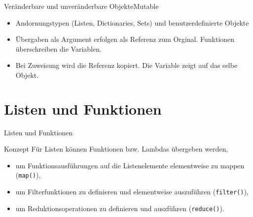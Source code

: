 \documentclass[xelatex,aspectratio=169]{beamer}
\begin{document}
\begin{frame}{Veränderbare und unveränderbare Objekte}{Mutable}
    \begin{itemize}
        \item Andornungstypen (Listen, Dictionaries, Sets) und benutzerdefinierte Objekte
        \item Übergaben als Argument erfolgen als Referenz zum Orginal. Funktionen überschreiben die Variablen.
        \item Bei Zuweisung wird die Referenz kopiert. Die Variable zeigt auf das selbe Objekt.
    \end{itemize}
\end{frame}

\section{Listen und Funktionen}

\begin{frame}{Listen und Funktionen}
    \begin{block}{Konzept}
        Für Listen können Funktionen bzw. Lambdas übergeben werden,
        \begin{itemize}
            \item um Funktionsausführungen auf die Listenelemente elementweise zu mappen (\texttt{map()}),
            \item um Filterfunktionen zu definieren und elementweise auszuführen (\texttt{filter()}),
            \item um Reduktionsoperationen zu definieren und auszführen (\texttt{reduce()}).
        \end{itemize}
    \end{block}
\end{frame}
\end{document}

